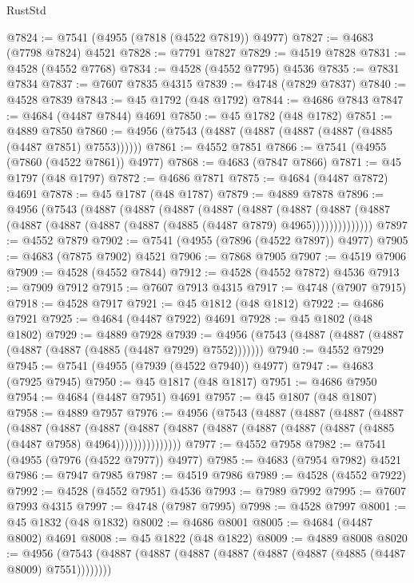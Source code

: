\begin{lexlean}{RustStd}
\begin{coremodule}
@7824 := @7541 (@4955 (@7818 (@4522 @7819)) @4977)
@7827 := @4683 (@7798 @7824) @4521
@7828 := @7791 @7827
@7829 := @4519 @7828
@7831 := @4528 (@4552 @7768)
@7834 := @4528 (@4552 @7795) @4536
@7835 := @7831 @7834
@7837 := @7607 @7835 @4315
@7839 := @4748 (@7829 @7837)
@7840 := @4528 @7839
@7843 := @45 @1792 (@48 @1792)
@7844 := @4686 @7843
@7847 := @4684 (@4487 @7844) @4691
@7850 := @45 @1782 (@48 @1782)
@7851 := @4889 @7850
@7860 := @4956 (@7543 (@4887 (@4887 (@4887 (@4887 (@4885 (@4487 @7851) @7553))))))
@7861 := @4552 @7851
@7866 := @7541 (@4955 (@7860 (@4522 @7861)) @4977)
@7868 := @4683 (@7847 @7866)
@7871 := @45 @1797 (@48 @1797)
@7872 := @4686 @7871
@7875 := @4684 (@4487 @7872) @4691
@7878 := @45 @1787 (@48 @1787)
@7879 := @4889 @7878
@7896 := @4956
    (@7543
      (@4887
        (@4887
          (@4887
            (@4887
              (@4887
                (@4887
                  (@4887 (@4887 (@4887 (@4887 (@4887 (@4887 (@4885 (@4487 @7879) @4965))))))))))))))
@7897 := @4552 @7879
@7902 := @7541 (@4955 (@7896 (@4522 @7897)) @4977)
@7905 := @4683 (@7875 @7902) @4521
@7906 := @7868 @7905
@7907 := @4519 @7906
@7909 := @4528 (@4552 @7844)
@7912 := @4528 (@4552 @7872) @4536
@7913 := @7909 @7912
@7915 := @7607 @7913 @4315
@7917 := @4748 (@7907 @7915)
@7918 := @4528 @7917
@7921 := @45 @1812 (@48 @1812)
@7922 := @4686 @7921
@7925 := @4684 (@4487 @7922) @4691
@7928 := @45 @1802 (@48 @1802)
@7929 := @4889 @7928
@7939 := @4956 (@7543 (@4887 (@4887 (@4887 (@4887 (@4887 (@4885 (@4487 @7929) @7552)))))))
@7940 := @4552 @7929
@7945 := @7541 (@4955 (@7939 (@4522 @7940)) @4977)
@7947 := @4683 (@7925 @7945)
@7950 := @45 @1817 (@48 @1817)
@7951 := @4686 @7950
@7954 := @4684 (@4487 @7951) @4691
@7957 := @45 @1807 (@48 @1807)
@7958 := @4889 @7957
@7976 := @4956
    (@7543
      (@4887
        (@4887
          (@4887
            (@4887
              (@4887
                (@4887
                  (@4887
                    (@4887
                      (@4887 (@4887 (@4887 (@4887 (@4887 (@4885 (@4487 @7958) @4964)))))))))))))))
@7977 := @4552 @7958
@7982 := @7541 (@4955 (@7976 (@4522 @7977)) @4977)
@7985 := @4683 (@7954 @7982) @4521
@7986 := @7947 @7985
@7987 := @4519 @7986
@7989 := @4528 (@4552 @7922)
@7992 := @4528 (@4552 @7951) @4536
@7993 := @7989 @7992
@7995 := @7607 @7993 @4315
@7997 := @4748 (@7987 @7995)
@7998 := @4528 @7997
@8001 := @45 @1832 (@48 @1832)
@8002 := @4686 @8001
@8005 := @4684 (@4487 @8002) @4691
@8008 := @45 @1822 (@48 @1822)
@8009 := @4889 @8008
@8020 := @4956 (@7543 (@4887 (@4887 (@4887 (@4887 (@4887 (@4887 (@4885 (@4487 @8009) @7551))))))))

\end{coremodule}
\end{lexlean}
